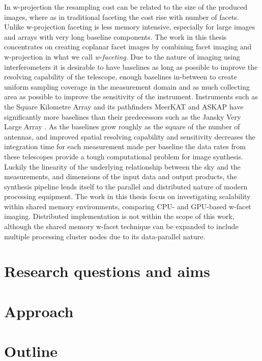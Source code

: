 In w-projection the resampling cost can be related to the size of the produced images, where as in traditional faceting the cost rise with number of facets. Unlike w-projection faceting 
is less memory intensive, especially for large images and arrays with very long baseline components. The work in this thesis concentrates on creating coplanar facet images by combining facet 
imaging and w-projection in what we call \textit{w-faceting}. Due to the nature of imaging using interferometers it is desirable to have baselines as long as possible to improve the resolving
capability of the telescope, enough baselines in-between to create uniform sampling coverage in the measurement domain and as much collecting area as possible to improve the sensitivity of 
the instrument. Instruments such as the Square Kilometre Array \cite{carilli2004science} and its pathfinders MeerKAT \cite{booth2009meerkat} and ASKAP \cite{johnston2008science} have significantly more
baselines than their predecessors such as the Jansky Very Large Array \cite{2041-8205-739-1-L1}. As the baselines grow roughly as the square of the number of antennas, and improved spatial resolving 
capability and sensitivity decreases the integration time for each measurement made per baseline the data rates from these telescopes provide a tough computational problem for image synthesis. Luckily 
the linearity of the underlying relationship between the sky and the measurements, and dimensions of the input data and output products, the synthesis pipeline lends itself to the parallel and 
distributed nature of modern processing equipment. The work in this thesis focus on investigating scalability within shared memory environments, comparing CPU- and GPU-based w-facet imaging.
Distributed implementation is not within the scope of this work, although the shared memory w-facet technique can be expanded to include multiple processing cluster nodes due to its data-parallel 
nature.
\section{Research questions and aims}
\section{Approach}
\section{Outline}
